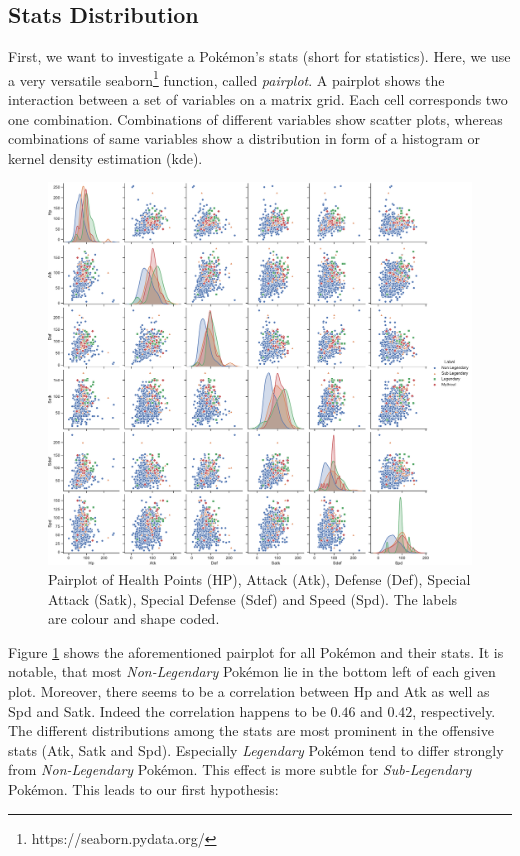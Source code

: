 \documentclass[conference]{IEEEtran}
\begin{document}
\subsection{Stats Distribution}
First, we want to investigate a Pokémon's stats (short for statistics). Here, we use a very versatile seaborn\footnote{https://seaborn.pydata.org/} function, called \textit{pairplot}. A pairplot shows the interaction between a set of variables on a matrix grid. Each cell corresponds two one combination. Combinations of different variables show scatter plots, whereas combinations of same variables show a distribution in form of a histogram or kernel density estimation (kde).
\begin{figure}[t]
	\centering
	\includegraphics[width=\linewidth]{../../figures/pairplot_hue_coded.pdf}
	\caption{Pairplot of Health Points (HP), Attack (Atk), Defense (Def), Special Attack (Satk), Special Defense (Sdef) and Speed (Spd). The labels are colour and shape coded.}
	\label{fig:pairplot}
\end{figure}
Figure \ref{fig:pairplot} shows the aforementioned pairplot for all Pokémon and their stats. It is notable, that most \textit{Non-Legendary} Pokémon lie in the bottom left of each given plot. Moreover, there seems to be a correlation between Hp and Atk as well as Spd and Satk. Indeed the correlation happens to be $0.46$ and $0.42$, respectively. The different distributions among the stats are most prominent in the offensive stats (Atk, Satk and Spd). Especially \textit{Legendary} Pokémon tend to differ strongly from \textit{Non-Legendary} Pokémon. This effect is more subtle for \textit{Sub-Legendary} Pokémon. This leads to our first hypothesis: 
\end{document}
